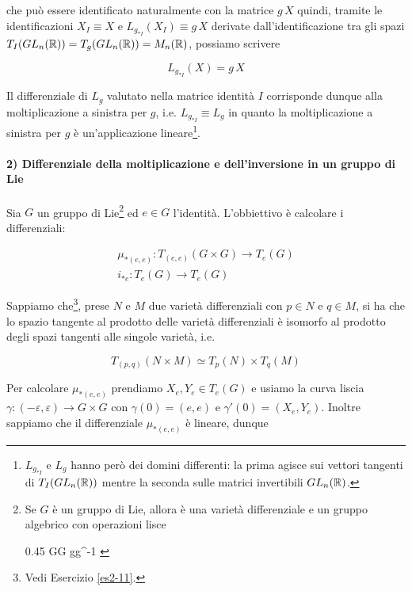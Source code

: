 che può essere identificato naturalmente con la matrice $ g \, X $ quindi, tramite le identificazioni $ X_{I} \equiv X $ e $ L_{g_{*I}}(X_{I}) \equiv g \, X $ derivate dall'identificazione tra gli spazi $ T_{I}(GL_{n}(\mathbb{R})) = T_{g}(GL_{n}(\mathbb{R})) = M_{n}(\mathbb{R}) $, possiamo scrivere

\begin{equation}
	L_{g_{*I}}(X) = g \, X
\end{equation}

Il differenziale di $ L_{g} $ valutato nella matrice identità $ I $ corrisponde dunque alla moltiplicazione a sinistra per $ g $, i.e. $ L_{g_{*I}} \equiv L_{g} $ in quanto la moltiplicazione a sinistra per $ g $ è un'applicazione lineare\footnote{%
	$ L_{g_{*I}} $ e $ L_{g} $ hanno però dei domini differenti: la prima agisce sui vettori tangenti di $ T_{I}(GL_{n}(\mathbb{R})) $ mentre la seconda sulle matrici invertibili $ GL_{n}(\mathbb{R}) $.%
}.

\paragraph{2) Differenziale della moltiplicazione e dell'inversione in un gruppo di Lie}

Sia $ G $ un gruppo di Lie\footnote{%
	Se $ G $ è un gruppo di Lie, allora è una varietà differenziale e un gruppo algebrico con operazioni lisce
	
		{0.45}{%
				{G}{G}
				{g}{g^{-1}}
				}%
} ed $ e \in G $ l'identità. L'obbiettivo è calcolare i differenziali:

\begin{gather}
	\mu_{*(e,e)} : T_{(e,e)}(G \times G) \to T_{e}(G)\\
	i_{*e} : T_{e}(G) \to T_{e}(G)
\end{gather}

Sappiamo che\footnote{%
	Vedi Esercizio \ref{es2-11}.%
}, prese $ N $ e $ M $ due varietà differenziali con $ p \in N $ e $ q \in M $, si ha che lo spazio tangente al prodotto delle varietà differenziali è isomorfo al prodotto degli spazi tangenti alle singole varietà, i.e.

\begin{equation}
	T_{(p,q)}(N \times M) \simeq T_{p}(N) \times T_{q}(M)
\end{equation}

Per calcolare $ \mu_{*(e,e)} $ prendiamo $ X_{e},Y_{e} \in T_{e}(G) $ e usiamo la curva liscia $ \gamma : (-\varepsilon,\varepsilon) \to G \times G $ con $ \gamma(0)=(e,e) $ e $ \gamma'(0) = (X_{e},Y_{e}) $. Inoltre sappiamo che il differenziale $ \mu_{*(e,e)} $ è lineare, dunque

